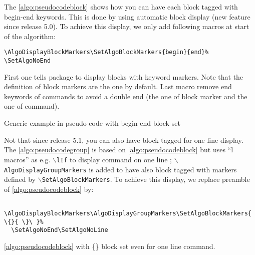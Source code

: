 \documentclass[a4paper]{article}
\begin{document}
The \autoref{algo:pseudocodeblock} shows how you can have each block tagged with begin-end
keywords. This is done by using automatic block
display (new feature since release 5.0). To achieve this display, we only add following
macros at start of the algorithm:\vspace{-1.5ex}
\begin{verbatim}
\AlgoDisplayBlockMarkers\SetAlgoBlockMarkers{begin}{end}%
\SetAlgoNoEnd
\end{verbatim}
\vspace{-1.5ex}First one tells package to display blocks with keyword markers. Note that
the definition of block markers are the one by default. Last macro remove end keywords of
commands to avoid a double end (the one of block marker and the one of command).
\begin{algorithm}\AlgoDisplayBlockMarkers\SetAlgoNoEnd{}
  \caption{Generic example in pseudo-code with begin-end block set}\label{algo:pseudocodeblock}
  
\end{algorithm}

Not that since release 5.1, you can also have block tagged for one line display. The
\autoref{algo:pseudocodegroup} is based on \autoref{algo:pseudocodeblock} but uses ``l macros'' as e.g. \texttt{$\backslash$lIf} to display command on one line ; \texttt{$\backslash$AlgoDisplayGroupMarkers} is added to have also block tagged with markers defined by \texttt{$\backslash$SetAlgoBlockMarkers}. To achieve this display, we replace preamble of \autoref{algo:pseudocodeblock} by:\vspace{-1.5ex}
\begin{verbatim}
  \AlgoDisplayBlockMarkers\AlgoDisplayGroupMarkers\SetAlgoBlockMarkers{ \{}{ \}\ }%
  \SetAlgoNoEnd\SetAlgoNoLine
\end{verbatim}
\begin{algorithm}
  \AlgoDisplayBlockMarkers\AlgoDisplayGroupMarkers\SetAlgoBlockMarkers{ \{}{ \}\ }%
  \SetAlgoNoEnd\SetAlgoNoLine
  \caption{\autoref{algo:pseudocodeblock} with \{\} block set even for one line command.}\label{algo:pseudocodegroup}
  
\end{algorithm}
\medskip
\end{document}
